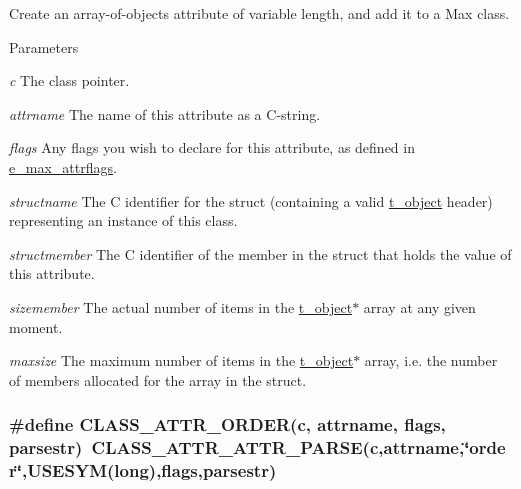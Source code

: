 Create an array-\/of-\/objects attribute of variable length, and add it to a Max class. 
\begin{DoxyParams}{Parameters}
\item[{\em c}]The class pointer. \item[{\em attrname}]The name of this attribute as a C-\/string. \item[{\em flags}]Any flags you wish to declare for this attribute, as defined in \hyperlink{group__attr_gaf296cfc6741bb19207f6ed8062809115}{e\_\-max\_\-attrflags}. \item[{\em structname}]The C identifier for the struct (containing a valid \hyperlink{structt__object}{t\_\-object} header) representing an instance of this class. \item[{\em structmember}]The C identifier of the member in the struct that holds the value of this attribute. \item[{\em sizemember}]The actual number of items in the \hyperlink{structt__object}{t\_\-object}$\ast$ array at any given moment. \item[{\em maxsize}]The maximum number of items in the \hyperlink{structt__object}{t\_\-object}$\ast$ array, i.e. the number of members allocated for the array in the struct. \end{DoxyParams}
\hypertarget{group__attr_gad7180abb3483e57b94e3c2603b862730}{
\subsubsection[{CLASS\_\-ATTR\_\-ORDER}]{\setlength{\rightskip}{0pt plus 5cm}\#define CLASS\_\-ATTR\_\-ORDER(c, \/  attrname, \/  flags, \/  parsestr)~CLASS\_\-ATTR\_\-ATTR\_\-PARSE(c,attrname,\char`\"{}order\char`\"{},USESYM(long),flags,parsestr)}}
\label{group__attr_gad7180abb3483e57b94e3c2603b862730}


